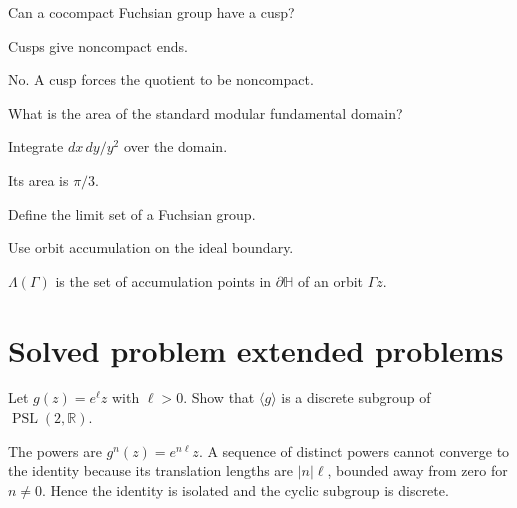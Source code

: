 \begin{exercise}\label{exr:vii35-22}
Can a cocompact Fuchsian group have a cusp?
\end{exercise}

\begin{hint}
Cusps give noncompact ends.
\end{hint}

\begin{solution}
No. A cusp forces the quotient to be noncompact.
\end{solution}

\begin{exercise}\label{exr:vii35-23}
What is the area of the standard modular fundamental domain?
\end{exercise}

\begin{hint}
Integrate \(dx\,dy/y^2\) over the domain.
\end{hint}

\begin{solution}
Its area is \(\pi/3\).
\end{solution}

\begin{exercise}\label{exr:vii35-24}
Define the limit set of a Fuchsian group.
\end{exercise}

\begin{hint}
Use orbit accumulation on the ideal boundary.
\end{hint}

\begin{solution}
\(\Lambda(\Gamma)\) is the set of accumulation points in \(\partial\mathbb H\) of an orbit \(\Gamma z\).
\end{solution}

\section{Solved problem extended problems}

\begin{problem}\label{prob:vii35-01}
Let \(g(z)=e^\ell z\) with \(\ell>0\).  Show that \(\langle g\rangle\) is a discrete subgroup of \(\operatorname{PSL}(2,\mathbb R)\).
\end{problem}

\begin{solution}
The powers are \(g^n(z)=e^{n\ell}z\).  A sequence of distinct powers cannot converge to the identity because its translation lengths are \(|n|\ell\), bounded away from zero for \(n\ne0\).  Hence the identity is isolated and the cyclic subgroup is discrete.
\end{solution}

